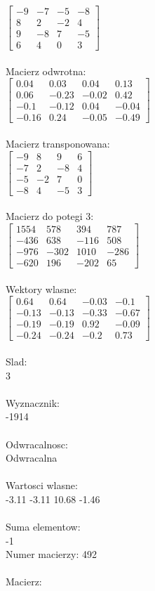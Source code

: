 \documentclass[a4paper,12pt]{article}
\begin{document}
$\begin{bmatrix} -9&-7&-5&-8\\8&2&-2&4\\9&-8&7&-5\\6&4&0&3 \end{bmatrix}$
\\
\\
Macierz odwrotna:\\

$\begin{bmatrix} 0.04&0.03&0.04&0.13\\0.06&-0.23&-0.02&0.42\\-0.1&-0.12&0.04&-0.04\\-0.16&0.24&-0.05&-0.49 \end{bmatrix}$
\\
\\
Macierz transponowana:\\

$\begin{bmatrix} -9&8&9&6\\-7&2&-8&4\\-5&-2&7&0\\-8&4&-5&3 \end{bmatrix}$
\\
\\
Macierz do potegi 3:\\

$\begin{bmatrix} 1554&578&394&787\\-436&638&-116&508\\-976&-302&1010&-286\\-620&196&-202&65 \end{bmatrix}$
\\
\\
Wektory wlasne:\\

$\begin{bmatrix} 0.64&0.64&-0.03&-0.1\\-0.13&-0.13&-0.33&-0.67\\-0.19&-0.19&0.92&-0.09\\-0.24&-0.24&-0.2&0.73 \end{bmatrix}$
\\
\\
Slad:\\
3
\\
\\
Wyznacznik:\\
-1914
\\
\\
Odwracalnosc:\\
Odwracalna
\\
\\
Wartosci wlasne:\\
-3.11 -3.11 10.68 -1.46
\\
\\
Suma elementow:\\
-1
\\
\newpage
Numer macierzy:
492
\\
\\
Macierz:\\
\end{document}
